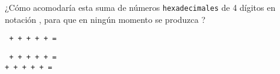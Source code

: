 \begin{enunciado}{\ejercicio}
  ¿Cómo acomodaría esta suma de números \texttt{hexadecimales} de 4 dígitos en notación \compDos, para que en ningún
  momento se produzca \overflow?
  \begin{center}
    \tt
     +  +  +  +  +  = 
  \end{center}
\end{enunciado}

  \begin{center}
    \tt
     +  +  +  +  +  = \\
     +  +  +  +  +  = 
  \end{center}
